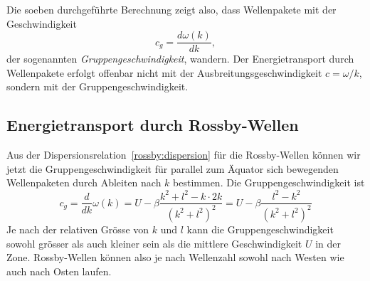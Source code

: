 Die soeben durchgeführte Berechnung zeigt also, dass Wellenpakete
mit der Geschwindigkeit 
\[
c_g=\frac{d\omega(k)}{dk},
\]
der sogenannten {\em Gruppengeschwindigkeit}, wandern.
%
Der Energietransport durch Wellenpakete erfolgt offenbar nicht
mit der Ausbreitungsgeschwindigkeit $c=\omega/k$, sondern mit der
Gruppengeschwindigkeit.

\subsection{Energietransport durch Rossby-Wellen\label{rossby:transport}}
Aus der Dispersionsrelation~\eqref{rossby:dispersion}
für die Rossby-Wellen können wir jetzt die Gruppengeschwindigkeit
für parallel zum Äquator sich bewegenden Wellenpaketen
durch Ableiten nach $k$ bestimmen.
Die Gruppengeschwindigkeit ist
\begin{equation}
c_g
=
\frac{d}{dk}\omega(k)
=
U-\beta
\frac{k^2+l^2-k\cdot 2k}{(k^2+l^2)^2}
=
U-\beta
\frac{l^2-k^2}{(k^2+l^2)^2}
\end{equation}
Je nach der relativen Grösse von $k$ und $l$ kann die
Gruppengeschwindigkeit sowohl grösser als auch kleiner sein als die
mittlere Geschwindigkeit $U$ in der Zone.
Rossby-Wellen können also je nach Wellenzahl sowohl nach Westen wie
auch nach Osten laufen.







